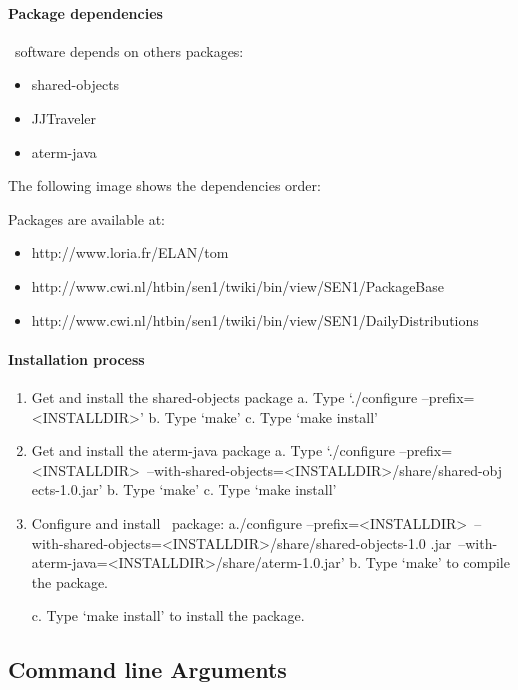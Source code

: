 \paragraph{Package dependencies}
\TOM\ software depends on others packages:
\begin{itemize}
\item shared-objects
\item JJTraveler
\item aterm-java
\end{itemize}
The following image shows the dependencies order:


Packages are available at:
\begin{itemize}
\item http://www.loria.fr/ELAN/tom
\item http://www.cwi.nl/htbin/sen1/twiki/bin/view/SEN1/PackageBase 
\item http://www.cwi.nl/htbin/sen1/twiki/bin/view/SEN1/DailyDistributions 
\end{itemize}    

\paragraph{Installation process}
\begin{enumerate}
\item Get and install the shared-objects package
         a. Type `./configure --prefix=<INSTALLDIR>'
         b. Type `make'
         c. Type `make install'
\item Get and install the aterm-java package
         a. Type `./configure --prefix=<INSTALLDIR>\
                              --with-shared-objects=<INSTALLDIR>/share/shared-obj
ects-1.0.jar'
         b. Type `make'
         c. Type `make install'

\item Configure and install \TOM\ package:
         a./configure --prefix=<INSTALLDIR>\
                      --with-shared-objects=<INSTALLDIR>/share/shared-objects-1.0
.jar\
                      --with-aterm-java=<INSTALLDIR>/share/aterm-1.0.jar'
         b. Type `make' to compile the package.

         c. Type `make install' to install the package.
\end{enumerate}


\subsection{Command line Arguments}
